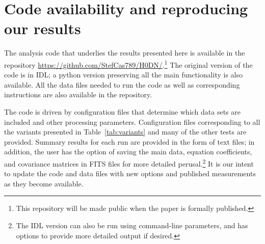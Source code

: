\section{Code availability and reproducing our results}

The analysis code that underlies the results presented here is available in the repository \url{https://github.com/StefCas789/H0DN/}.\footnote{This repository will be made public when the paper is formally published.} The original version of the code is in IDL; a python version preserving all the main functionality is also available.
All the data files needed to run the code as well as corresponding instructions are also available in the repository.

The code is driven by configuration files that determine which data sets are included and other processing parameters. Configuration files corresponding to all the variants presented in Table~\ref{tab:variants} and many of the other tests are provided. Summary results for each run are provided in the form of text files; in addition, the user has the option of saving the main data, equation coefficients, and covariance matrices in FITS files for more detailed perusal.\footnote{The IDL version can also be run using command-line parameters, and has options to provide more detailed output if desired.} It is our intent to update the code and data files with new options and published measurements as they become available.

